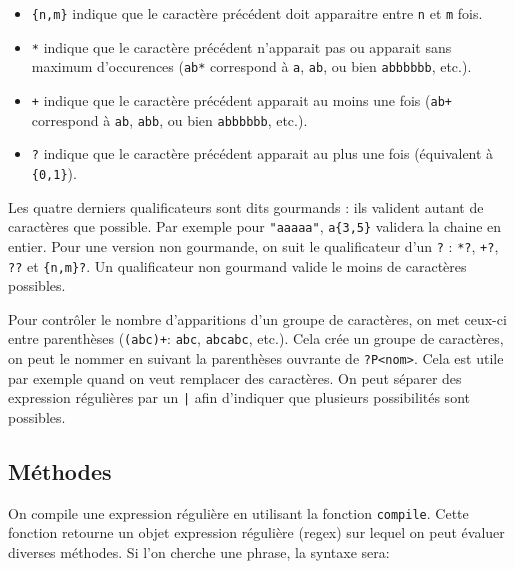\documentclass[a4paper, 10pt]{article}
\begin{document}
\begin{description}
\begin{itemize}
        \item \og\texttt{\{n,m\}}\fg{} indique que le caractère précédent doit apparaitre entre \texttt{n} et \texttt{m} fois.
        \item \og\texttt{*}\fg{} indique que le caractère précédent n'apparait pas ou apparait sans maximum d'occurences (\texttt{ab*} correspond à \texttt{a}, \texttt{ab}, ou bien \texttt{abbbbbb}, etc.).
        \item \og\texttt{+}\fg{} indique que le caractère précédent apparait au moins une fois (\texttt{ab+} correspond à \texttt{ab}, \texttt{abb}, ou bien \texttt{abbbbbb}, etc.).
        \item \og\texttt{?}\fg{} indique que le caractère précédent apparait au plus une fois (équivalent à \texttt{\{0,1\}}).
    \end{itemize}
\end{description}

Les quatre derniers qualificateurs sont dits gourmands : ils valident autant de caractères que possible. Par exemple pour \texttt{"aaaaa"}, \texttt{a\{3,5\}} validera la chaine en entier. Pour une version non gourmande, on suit le qualificateur d'un \texttt{?} : \texttt{*?}, \texttt{+?}, \texttt{??} et \texttt{\{n,m\}?}. Un qualificateur non gourmand valide le moins de caractères possibles.\bigskip

Pour contrôler le nombre d'apparitions d'un groupe de caractères, on met ceux-ci entre parenthèses (\texttt{(abc)+}: \texttt{abc}, \texttt{abcabc}, etc.). Cela crée un groupe de caractères, on peut le nommer en suivant la parenthèses ouvrante de \texttt{?P<nom>}. Cela est utile par exemple quand on veut remplacer des caractères. On peut séparer des expression régulières par un \texttt{|} afin d'indiquer que plusieurs possibilités sont possibles.\bigskip

\subsection{Méthodes}
On compile une expression régulière en utilisant la fonction \texttt{compile}. Cette fonction retourne un objet expression régulière (regex) sur lequel on peut évaluer diverses méthodes. Si l'on cherche une phrase, la syntaxe sera:
\end{document}

